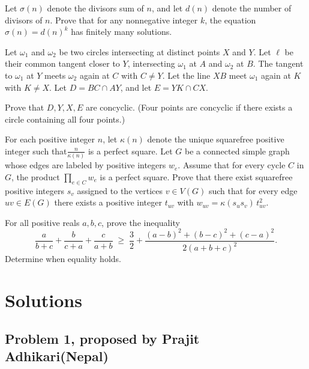 \documentclass[11pt]{scrartcl}
\begin{document}
\begin{problem}
    Let $\sigma(n)$ denote the divisors sum of $n$, and let $d(n)$ denote the number of divisors of $n$. Prove that for any nonnegative 
    integer $k$, the equation $\sigma(n) = d(n)^k$ has finitely many solutions.
\end{problem}

\begin{problem}
    Let $\omega_1$ and $\omega_2$ be two circles intersecting at distinct points $X$ and $Y$. Let $\ell$ be their common tangent closer to $Y$, 
    intersecting $\omega_1$ at $A$ and $\omega_2$ at $B$. The tangent to $\omega_1$ at $Y$ meets $\omega_2$ again at $C$ with $C \neq Y$. 
    Let the line $XB$ meet $\omega_1$ again at $K$ with $K \neq X$. Let $D = BC \cap AY$, and let $E = YK \cap CX$.

    Prove that $D, Y, X, E$ are concyclic. (Four points are concyclic if there exists a circle containing all four points.)
\end{problem}

\begin{problem}
    For each positive integer $n$, let $\kappa(n)$ denote the unique squarefree positive integer such that$\frac{n}{\kappa(n)}$ is a perfect square.
    Let $G$ be a connected simple graph whose edges are labeled by positive integers $w_e$. Assume that for every cycle $C$ in $G$, the product
    $\prod_{e\in C} w_e$ is a perfect square. Prove that there exist squarefree positive integers $s_v$ assigned to the vertices $v\in V(G)$ 
    such that for every edge $uv\in E(G)$ there exists a positive integer $t_{uv}$ with $w_{uv}=\kappa(s_us_v)\,t_{uv}^2$.
\end{problem}

\begin{problem}
    For all positive reals $a,b,c$, prove the inequality
    $$\frac{a}{b+c}+\frac{b}{c+a}+\frac{c}{a+b} \; \ge\; \frac32+\frac{(a-b)^2+(b-c)^2+(c-a)^2}{2(a+b+c)^2}.$$
    Determine when equality holds.
\end{problem}

\newpage

\section{Solutions}

\subsection{Problem 1, proposed by Prajit Adhikari(Nepal)}
\end{document}
